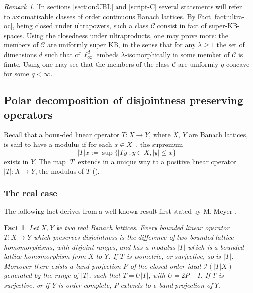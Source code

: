 \documentclass[11pt]{amsart}
\theoremstyle{plain}
\newtheorem{fact}[theorem]{Fact}
\theoremstyle{remark}
\newtheorem{remark}[theorem]{Remark}
\newcommand{\C}{\mathcal C}
\newcommand{\I}{\mathcal I}
\begin{document}
\begin{remark}l\label{rem:unif-ultra-oc}
In sections \ref{section:UBL} and \ref{script-C} several statements will refer to axiomatizable classes of order continuous Banach lattices. By Fact \ref{fact:ultra-oc}, being closed under ultrapowers, such a class $\C$ consist in fact of super-KB-spaces. Using the closedness under ultraproducts, one may prove more: the members of $\C$ are uniformly super KB, in the sense that for any $\lambda\ge 1$ the set of dimensions  $d$ such that of $\ell_\infty^d$ embeds $\lambda$-isomorphically in some member of $\C$ is finite. Using \cite[Theorems 1.f.12 and 1.f.7]{LT} one may see that the members of the class $\C$ are uniformly $q$-concave for some $q<\infty$.
\end{remark}

\subsection{Polar decomposition of disjointness preserving operators}

Recall that a boun-ded linear operator $T:X\to Y$, where $X$, $Y$ are Banach lattices, is said to have a modulus if for each $x\in X_+$, the supremum $$|T|x:=\sup \{|Ty|: y\in X, |y|\le x\}$$ exists in $Y$. The map $|T|$ extends in a unique way to a positive linear operator $|T|: X\to Y$, the modulus of $T$  (\cite[Theorem 1.3.2]{MN}).


\subsubsection{The real case}
The following fact derives from a well known result first stated by M. Meyer  \cite[Th\'eor\`eme 1.2]{M76}.

\begin{fact}\label{structure-dp-maps}Let $X,Y$ be two  real Banach lattices. Every bounded linear operator $T: X\to Y$ which preserves disjointness  is the difference of two bounded lattice homomorphisms, with disjoint ranges, and has a modulus $|T|$ which is a bounded lattice homomorphism from $X$ to $Y$. If $T$ is isometric, or surjective, so is $|T|$. Moreover  there exists a band projection $P$ of the closed order ideal $\I(|T|X)$ generated by the range of $|T|$, such that $T=U|T|$, with $U=2P-I$. If $T$ is surjective, or if $Y$ is order complete, $P$ extends to a band projection of $Y$. 
\end{fact}
\end{document}

